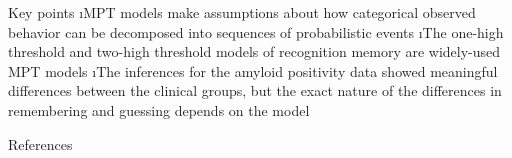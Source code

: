 \documentclass[10pt]{beamer}
\begin{document}
\begin{frame}[fragile]{Key points}
\bi
\i MPT models make assumptions about how categorical observed behavior can be decomposed into sequences of probabilistic events
\i The one-high threshold and two-high threshold models of recognition memory are widely-used MPT models
\i The inferences for the amyloid positivity data showed meaningful differences between the clinical groups, but the exact nature of the differences in remembering and guessing depends on the model 
\ei
\vspace{7em}
\end{frame}

\begin{frame}[allowframebreaks]{References}


\end{frame}
\end{document}
